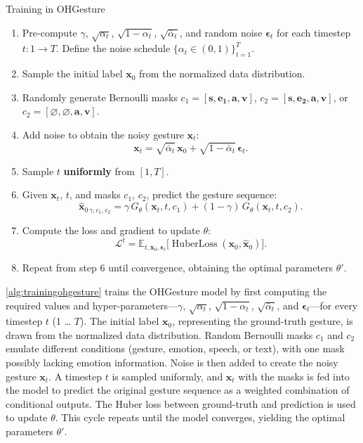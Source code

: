 \begin{algorithm}[h]
	\caption{Training in OHGesture}
	\label{alg:trainingohgesture}
	\setlength{\baselineskip}{10pt}
	\begin{enumerate}
		\item Pre-compute $\gamma$, $\sqrt{\alpha_t}$, $\sqrt{1-\alpha_t}$, $\sqrt{\bar{\alpha}_t}$, and random noise $\boldsymbol{\epsilon}_t$ for each timestep $t: 1 \rightarrow T$. Define the noise schedule $\{\alpha_t \in (0,1)\}_{t=1}^T$.
		\item Sample the initial label $\mathbf{x}_0$ from the normalized data distribution.
		\item Randomly generate Bernoulli masks
		$c_{1} = [ \mathbf{s}, \mathbf{e_1}, \mathbf{a}, \mathbf{v} ]$,
		$c_{2} = [ \mathbf{s}, \mathbf{e_2}, \mathbf{a}, \mathbf{v} ]$, or
		$c_{2} = [ \varnothing, \varnothing, \mathbf{a}, \mathbf{v} ]$.
		\item Add noise to obtain the noisy gesture $\mathbf{x}_t$:
		\[
		\mathbf{x}_t = \sqrt{\bar{\alpha}_t}\,\mathbf{x}_0 + \sqrt{1-\bar{\alpha}_t}\,\boldsymbol{\epsilon}_t.
		\]
		\item Sample $t$ \textbf{uniformly} from $[1, T]$.
		\item Given $\mathbf{x}_t$, $t$, and masks $c_1$, $c_2$, predict the gesture sequence:
		\[
		\hat{\mathbf{x}}_{0\,\gamma,c_{1},c_{2}}
		= \gamma\, G_{\theta}(\mathbf{x}_{t}, t, c_{1})
		+ (1-\gamma)\, G_{\theta}(\mathbf{x}_{t}, t, c_{2}).
		\]
		\item Compute the loss and gradient to update $\theta$:
		\[
		\mathcal{L}^t
		= \mathbb{E}_{t, \mathbf{x}_0, \boldsymbol{\epsilon}_t}
		\bigl[\operatorname{HuberLoss}(\mathbf{x}_0, \hat{\mathbf{x}}_0)\bigr].
		\]
		\item Repeat from step 6 until convergence, obtaining the optimal parameters $\theta'$.
	\end{enumerate}
\end{algorithm}

\autoref{alg:trainingohgesture} trains the OHGesture model by first computing the required values and hyper-parameters—$\gamma$, $\sqrt{\alpha_t}$, $\sqrt{1-\alpha_t}$, $\sqrt{\bar{\alpha}_t}$, and $\boldsymbol{\epsilon}_t$—for every timestep $t$ (1 … $T$).  
The initial label $\mathbf{x}_0$, representing the ground-truth gesture, is drawn from the normalized data distribution.  
Random Bernoulli masks $c_1$ and $c_2$ emulate different conditions (gesture, emotion, speech, or text), with one mask possibly lacking emotion information.  
Noise is then added to create the noisy gesture $\mathbf{x}_t$.  
A timestep $t$ is sampled uniformly, and $\mathbf{x}_t$ with the masks is fed into the model to predict the original gesture sequence as a weighted combination of conditional outputs.  
The Huber loss between ground-truth and prediction is used to update $\theta$.  
This cycle repeats until the model converges, yielding the optimal parameters $\theta'$.

